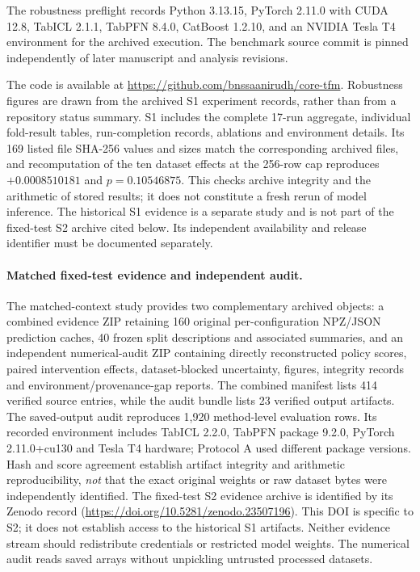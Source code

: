 \documentclass[a4paper,fleqn]{cas-sc}
\begin{document}
The robustness preflight records Python 3.13.15, PyTorch 2.11.0 with CUDA 12.8, TabICL 2.1.1, TabPFN 8.4.0, CatBoost 1.2.10, and an NVIDIA Tesla T4 environment for the archived execution. The benchmark source commit is pinned independently of later manuscript and analysis revisions.

The code is available at \url{https://github.com/bnssaanirudh/core-tfm}. Robustness figures are drawn from the archived S1 experiment records, rather than from a repository status summary. S1 includes the complete 17-run aggregate, individual fold-result tables, run-completion records, ablations and environment details. Its 169 listed file SHA-256 values and sizes match the corresponding archived files, and recomputation of the ten dataset effects at the 256-row cap reproduces $+0.0008510181$ and $p=0.10546875$. This checks archive integrity and the arithmetic of stored results; it does not constitute a fresh rerun of model inference. The historical S1 evidence is a separate study and is not part of the fixed-test S2 archive cited below. Its independent availability and release identifier must be documented separately.


\paragraph{Matched fixed-test evidence and independent audit.}
The matched-context study provides two complementary archived objects: a combined evidence ZIP retaining 160 original per-configuration NPZ/JSON prediction caches, 40 frozen split descriptions and associated summaries, and an independent numerical-audit ZIP containing directly reconstructed policy scores, paired intervention effects, dataset-blocked uncertainty, figures, integrity records and environment/provenance-gap reports. The combined manifest lists 414 verified source entries, while the audit bundle lists 23 verified output artifacts. The saved-output audit reproduces 1,920 method-level evaluation rows. Its recorded environment includes TabICL 2.2.0, TabPFN package 9.2.0, PyTorch 2.11.0+cu130 and Tesla T4 hardware; Protocol A used different package versions. Hash and score agreement establish artifact integrity and arithmetic reproducibility, \emph{not} that the exact original weights or raw dataset bytes were independently identified. The fixed-test S2 evidence archive is identified by its Zenodo record (\url{https://doi.org/10.5281/zenodo.23507196}). This DOI is specific to S2; it does not establish access to the historical S1 artifacts. Neither evidence stream should redistribute credentials or restricted model weights. The numerical audit reads saved arrays without unpickling untrusted processed datasets.
\end{document}
